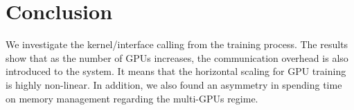 \section{Conclusion} \label{sec:conclusion}

We investigate the kernel/interface calling from the training process. The results show that as the number of GPUs increases, the communication overhead is also introduced to the system. It means that the horizontal scaling for GPU training is highly non-linear. In addition, we also found an asymmetry in spending time on memory management regarding the multi-GPUs regime.
